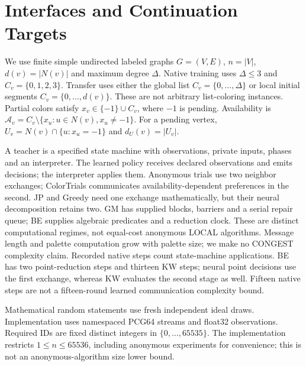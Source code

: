 \documentclass[10pt]{article}
\newcommand{\A}{\mathcal A}
\begin{document}
\section{Interfaces and Continuation Targets}
We use finite simple undirected labeled graphs $G=(V,E)$, $n=|V|$,
$d(v)=|N(v)|$ and maximum degree $\Delta$. Native training uses $\Delta\le3$
and $C_v=\{0,1,2,3\}$. Transfer uses either the global list
$C_v=\{0,\ldots,\Delta\}$ or local initial segments
$C_v=\{0,\ldots,d(v)\}$. These are not arbitrary list-coloring instances.
Partial colors satisfy $x_v\in\{-1\}\cup C_v$, where $-1$ is pending.
Availability is $\A_v=C_v\setminus\{x_u:u\in N(v),x_u\ne-1\}$.
For a pending vertex, $U_v=N(v)\cap\{u:x_u=-1\}$ and $d_U(v)=|U_v|$.

A teacher is a specified state machine with observations, private inputs,
phases and an interpreter. The learned policy receives declared observations
and emits decisions; the interpreter applies them. Anonymous trials use two
neighbor exchanges; ColorTrials communicates availability-dependent
preferences in the second. JP and Greedy need one exchange mathematically,
but their neural decomposition retains two. GM has supplied blocks, barriers
and a serial repair queue; BE supplies algebraic predicates and a reduction
clock. These are distinct computational regimes, not equal-cost anonymous
LOCAL algorithms. Message length and palette computation grow with palette
size; we make no CONGEST complexity claim.
Recorded native steps count state-machine applications. BE has two
point-reduction steps and thirteen KW steps; neural point decisions use the
first exchange, whereas KW evaluates the second stage as well. Fifteen
native steps are not a fifteen-round learned communication complexity bound.

Mathematical random statements use fresh independent ideal draws.
Implementation uses namespaced PCG64 streams and float32 observations.
Required IDs are fixed distinct integers in $\{0,\ldots,65535\}$. The
implementation restricts $1\le n\le65536$, including anonymous experiments
for convenience; this is not an anonymous-algorithm size lower bound.
\end{document}
